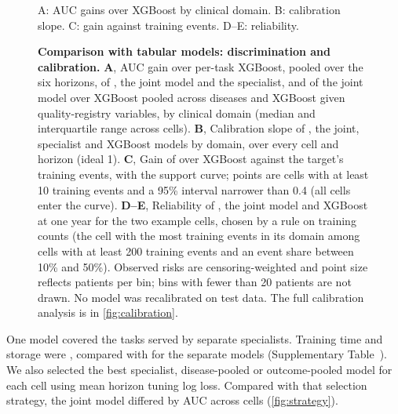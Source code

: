 \begin{figure}[H]
    {A: AUC gains over XGBoost by clinical domain. B: calibration slope.
    C: gain against training events. D--E: reliability.}
  \caption{\textbf{Comparison with tabular models: discrimination and
  calibration.} \textbf{A}, AUC gain over per-task XGBoost, pooled over the six
  horizons, of \opera{}, the joint model and the specialist, and of the joint
  model over XGBoost pooled across diseases and XGBoost given quality-registry
  variables, by clinical domain (median and interquartile range across cells).
  \textbf{B}, Calibration slope of \opera{}, the joint, specialist and XGBoost
  models by domain, over every cell and horizon (ideal 1). \textbf{C}, Gain of \opera{} over XGBoost
  against the target's training events, with the support curve; points are
  cells with at least 10 training events and a 95\% interval narrower than 0.4
  (all cells enter the curve).  \textbf{D--E},
  Reliability of \opera{}, the joint model and XGBoost at one year for the
  two example cells, chosen by a rule on training counts (the cell with the most
  training events in its domain among cells with at least 200 training events
  and an event share between 10\% and 50\%). Observed risks are censoring-weighted and point size reflects patients per
  bin; bins with fewer than 20 patients are not drawn. No model was recalibrated on test data. The full calibration analysis is in \cref{fig:calibration}.}
  \label{fig:tabular}
\end{figure}

One \opera{} model covered the tasks served by 
separate specialists. Training time and storage were ,
compared with  for the separate models
(Supplementary Table~). We also selected the best specialist,
disease-pooled or outcome-pooled model for each cell using mean horizon
tuning log loss.
Compared with that selection strategy, the joint model differed by
 AUC across
 cells (\cref{fig:strategy}).

